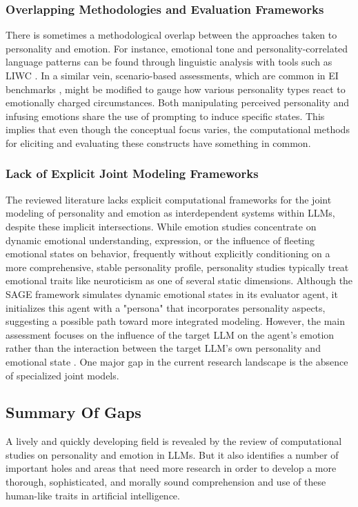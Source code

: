 \documentclass{DESSThesis}
\begin{document}
\subsubsection{Overlapping Methodologies and Evaluation Frameworks}
There is sometimes a methodological overlap between the approaches taken to personality and emotion. For instance, emotional tone and personality-correlated language patterns can be found through linguistic analysis with tools such as LIWC \cite{jiang_personallm_2024,chang_modeling_2024}. In a similar vein, scenario-based assessments, which are common in EI benchmarks \cite{sabour_emobench_2024,wang_emotional_2023}, might be modified to gauge how various personality types react to emotionally charged circumstances. Both manipulating perceived personality \cite{caron_manipulating_2023,jiang_evaluating_2023} and infusing emotions \cite{mozikov_good_2024,chang_modeling_2024} share the use of prompting to induce specific states. This implies that even though the conceptual focus varies, the computational methods for eliciting and evaluating these constructs have something in common.

\subsubsection{Lack of Explicit Joint Modeling Frameworks}
The reviewed literature lacks explicit computational frameworks for the joint modeling of personality and emotion as interdependent systems within LLMs, despite these implicit intersections. While emotion studies concentrate on dynamic emotional understanding, expression, or the influence of fleeting emotional states on behavior, frequently without explicitly conditioning on a more comprehensive, stable personality profile, personality studies typically treat emotional traits like neuroticism as one of several static dimensions. Although the SAGE framework simulates dynamic emotional states in its evaluator agent, it initializes this agent with a "persona" that incorporates personality aspects, suggesting a possible path toward more integrated modeling. However, the main assessment focuses on the influence of the target LLM on the agent's emotion rather than the interaction between the target LLM's own personality and emotional state \cite{zhang_sentient_2025}. One major gap in the current research landscape is the absence of specialized joint models.

\subsection{Summary Of Gaps}
A lively and quickly developing field is revealed by the review of computational studies on personality and emotion in LLMs. But it also identifies a number of important holes and areas that need more research in order to develop a more thorough, sophisticated, and morally sound comprehension and use of these human-like traits in artificial intelligence.
\end{document}
